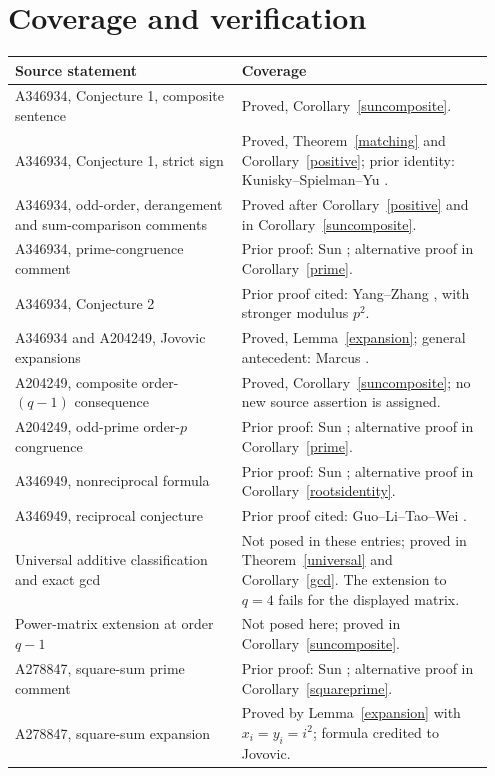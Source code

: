 \documentclass[11pt]{article}
\begin{document}
\section{Coverage and verification}
\small
\begin{longtable}{@{}p{0.45\linewidth}p{0.50\linewidth}@{}}
\toprule
Source statement & Coverage \\
\midrule
\endhead
A346934, Conjecture 1, composite sentence & Proved, Corollary~\ref{suncomposite}. \\
A346934, Conjecture 1, strict sign & Proved, Theorem~\ref{matching} and Corollary~\ref{positive}; prior identity: Kunisky--Spielman--Yu \cite{ksy}. \\
A346934, odd-order, derangement and sum-comparison comments & Proved after Corollary~\ref{positive} and in Corollary~\ref{suncomposite}. \\
A346934, prime-congruence comment & Prior proof: Sun \cite{sun}; alternative proof in Corollary~\ref{prime}. \\
A346934, Conjecture 2 & Prior proof cited: Yang--Zhang \cite[(12)]{yangzhang}, with stronger modulus $p^2$. \\
A346934 and A204249, Jovovic expansions & Proved, Lemma~\ref{expansion}; general antecedent: Marcus \cite{marcus}. \\
A204249, composite order-$(q-1)$ consequence & Proved, Corollary~\ref{suncomposite}; no new source assertion is assigned. \\
A204249, odd-prime order-$p$ congruence & Prior proof: Sun \cite{sun}; alternative proof in Corollary~\ref{prime}. \\
A346949, nonreciprocal formula & Prior proof: Sun \cite{sun}; alternative proof in Corollary~\ref{rootsidentity}. \\
A346949, reciprocal conjecture & Prior proof cited: Guo--Li--Tao--Wei \cite{guo}. \\
Universal additive classification and exact gcd & Not posed in these entries; proved in Theorem~\ref{universal} and Corollary~\ref{gcd}. The extension to $q=4$ fails for the displayed matrix. \\
Power-matrix extension at order $q-1$ & Not posed here; proved in Corollary~\ref{suncomposite}. \\
A278847, square-sum prime comment & Prior proof: Sun \cite{powers,sun}; alternative proof in Corollary~\ref{squareprime}. \\
A278847, square-sum expansion & Proved by Lemma~\ref{expansion} with $x_i=y_i=i^2$; formula credited to Jovovic. \\

\end{longtable}
\end{document}
